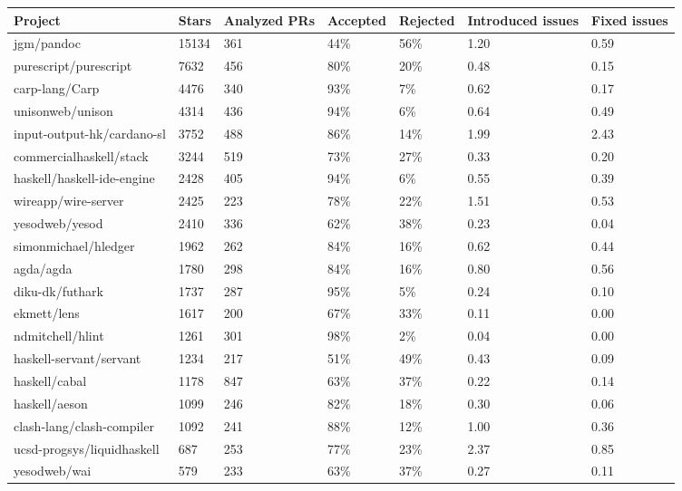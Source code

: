 \begin{tabular}{|p{4cm}p{0.8cm}p{1cm}p{1cm}p{1cm}p{1.2cm}p{0.8cm}|}
  \hline
Project & Stars & Analyzed PRs & Accepted & Rejected & Introduced issues & Fixed issues \\ 
  \hline \hline
jgm/pandoc & 15134 & 361 & 44\% & 56\% & 1.20 & 0.59 \\ 
  purescript/purescript & 7632 & 456 & 80\% & 20\% & 0.48 & 0.15 \\ 
  carp-lang/Carp & 4476 & 340 & 93\% & 7\% & 0.62 & 0.17 \\ 
  unisonweb/unison & 4314 & 436 & 94\% & 6\% & 0.64 & 0.49 \\ 
  input-output-hk/cardano-sl & 3752 & 488 & 86\% & 14\% & 1.99 & 2.43 \\ 
  commercialhaskell/stack & 3244 & 519 & 73\% & 27\% & 0.33 & 0.20 \\ 
  haskell/haskell-ide-engine & 2428 & 405 & 94\% & 6\% & 0.55 & 0.39 \\ 
  wireapp/wire-server & 2425 & 223 & 78\% & 22\% & 1.51 & 0.53 \\ 
  yesodweb/yesod & 2410 & 336 & 62\% & 38\% & 0.23 & 0.04 \\ 
  simonmichael/hledger & 1962 & 262 & 84\% & 16\% & 0.62 & 0.44 \\ 
  agda/agda & 1780 & 298 & 84\% & 16\% & 0.80 & 0.56 \\ 
  diku-dk/futhark & 1737 & 287 & 95\% & 5\% & 0.24 & 0.10 \\ 
  ekmett/lens & 1617 & 200 & 67\% & 33\% & 0.11 & 0.00 \\ 
  ndmitchell/hlint & 1261 & 301 & 98\% & 2\% & 0.04 & 0.00 \\ 
  haskell-servant/servant & 1234 & 217 & 51\% & 49\% & 0.43 & 0.09 \\ 
  haskell/cabal & 1178 & 847 & 63\% & 37\% & 0.22 & 0.14 \\ 
  haskell/aeson & 1099 & 246 & 82\% & 18\% & 0.30 & 0.06 \\ 
  clash-lang/clash-compiler & 1092 & 241 & 88\% & 12\% & 1.00 & 0.36 \\ 
  ucsd-progsys/liquidhaskell & 687 & 253 & 77\% & 23\% & 2.37 & 0.85 \\ 
  yesodweb/wai & 579 & 233 & 63\% & 37\% & 0.27 & 0.11 \\ 
   \hline
\end{tabular}
